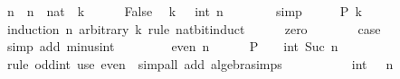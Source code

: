 \begin{isabellebody}
\ n\ \ {\isachardoublequoteopen}n\ {\isacharequal}{\kern0pt}\ nat\ {\isacharparenleft}{\kern0pt}{\isacharminus}{\kern0pt}\ k\ {\isacharminus}{\kern0pt}\ {}{\isacharparenright}{\kern0pt}{\isachardoublequoteclose}\isanewline
\ \ \isamarkupfalse%
\ False\ \isamarkupfalse%
\ {\isachardoublequoteopen}k\ {\isacharequal}{\kern0pt}\ {\isacharminus}{\kern0pt}\ int\ n\ {\isacharminus}{\kern0pt}\ {}{\isachardoublequoteclose}\isanewline
\ \ \ \ \isamarkupfalse%
\ simp\isanewline
\ \ \isamarkupfalse%
\ \isamarkupfalse%
\ {\isachardoublequoteopen}P\ k{\isachardoublequoteclose}\isanewline
\ \ \isamarkupfalse%
\ {\isacharparenleft}{\kern0pt}induction\ n\ arbitrary{\isacharcolon}{\kern0pt}\ k\ rule{\isacharcolon}{\kern0pt}\ nat{\isacharunderscore}{\kern0pt}bit{\isacharunderscore}{\kern0pt}induct{\isacharparenright}{\kern0pt}\isanewline
\ \ \ \ \isamarkupfalse%
\ zero\isanewline
\ \ \ \ \isamarkupfalse%
\ \isamarkupfalse%
\ {\isacharquery}{\kern0pt}case\isanewline
\ \ \ \ \ \ \isamarkupfalse%
\ {\isacharparenleft}{\kern0pt}simp\ add{\isacharcolon}{\kern0pt}\ minus{\isacharunderscore}{\kern0pt}int{\isacharparenright}{\kern0pt}\isanewline
\ \ \isamarkupfalse%
\isanewline
\ \ \ \ \isamarkupfalse%
\ {\isacharparenleft}{\kern0pt}even\ n{\isacharparenright}{\kern0pt}\isanewline
\ \ \ \ \isamarkupfalse%
\ {\isachardoublequoteopen}P\ {\isacharparenleft}{\kern0pt}{}\ {\isacharplus}{\kern0pt}\ {\isacharparenleft}{\kern0pt}{\isacharminus}{\kern0pt}\ int\ {\isacharparenleft}{\kern0pt}Suc\ n{\isacharparenright}{\kern0pt}\ {\isacharasterisk}{\kern0pt}\ {}{\isacharparenright}{\kern0pt}{\isacharparenright}{\kern0pt}{\isachardoublequoteclose}\isanewline
\ \ \ \ \ \ \isamarkupfalse%
\ {\isacharparenleft}{\kern0pt}rule\ odd{\isacharunderscore}{\kern0pt}int{\isacharparenright}{\kern0pt}\ {\isacharparenleft}{\kern0pt}use\ even\ \ {\isacartoucheopen}simp{\isacharunderscore}{\kern0pt}all\ add{\isacharcolon}{\kern0pt}\ algebra{\isacharunderscore}{\kern0pt}simps{\isacartoucheclose}{\isacharparenright}{\kern0pt}\isanewline
\ \ \ \ \isamarkupfalse%
\ \isamarkupfalse%
\ {\isachardoublequoteopen}{\isasymdots}\ {\isacharequal}{\kern0pt}\ {\isacharminus}{\kern0pt}\ int\ {\isacharparenleft}{\kern0pt}{}\ {\isacharasterisk}{\kern0pt}\ n{\isacharparenright}{\kern0pt}\ {\isacharminus}{\kern0pt}\ {}{\isachardoublequoteclose}\isanewline

\end{isabellebody}
